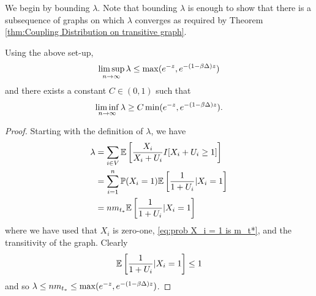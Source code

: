 	We begin by bounding $\lambda$. Note that bounding $\lambda$ is enough to show that there is a subsequence of graphs on which $\lambda$ converges as required by Theorem \ref{thm:Coupling Distribution on transitive graph}.
	\begin{lemma}
	\label{lem:nDlambda}
		Using the above set-up, 
		\begin{equation}
			\limsup_{n \rightarrow \infty} \lambda \leq \max(e^{-z}, e^{-(1 - \beta\Delta)z})
		\end{equation}
		and there exists a constant $C \in (0,1)$ such that
		\begin{equation}
			\liminf_{n \rightarrow \infty} \lambda \geq C \min(e^{-z}, e^{-(1 - \beta\Delta)z}).
		\end{equation}
	\end{lemma}
	\begin{proof}
		Starting with the definition of $\lambda$, we have
		\begin{align}
			\lambda &= \sum_{i \in V} \mathbb{E}\left[\frac{X_i}{X_i + U_i} I[ X_i + U_i \geq 1] \right]\\
				&= \sum_{i = 1}^n \mathbb{P}(X_i = 1) \mathbb{E} \left[\frac{1}{1 + U_i}| X_i = 1\right]\\
				&= n m_{t_*} \mathbb{E} \left[\frac{1}{1 + U_i}| X_i = 1\right]
		\end{align}
		where we have used that $X_i$ is zero-one, \eqref{eq:prob X_i = 1 is m_t*}, and the transitivity of the graph.
		Clearly 
		\begin{align}
			\mathbb{E} \left[\frac{1}{1 + U_i}| X_i = 1\right] \leq 1
		\end{align}
		and so $\lambda \leq n m_{t_*} \leq \max(e^{-z}, e^{-(1 - \beta\Delta)z})$.


\end{proof}
